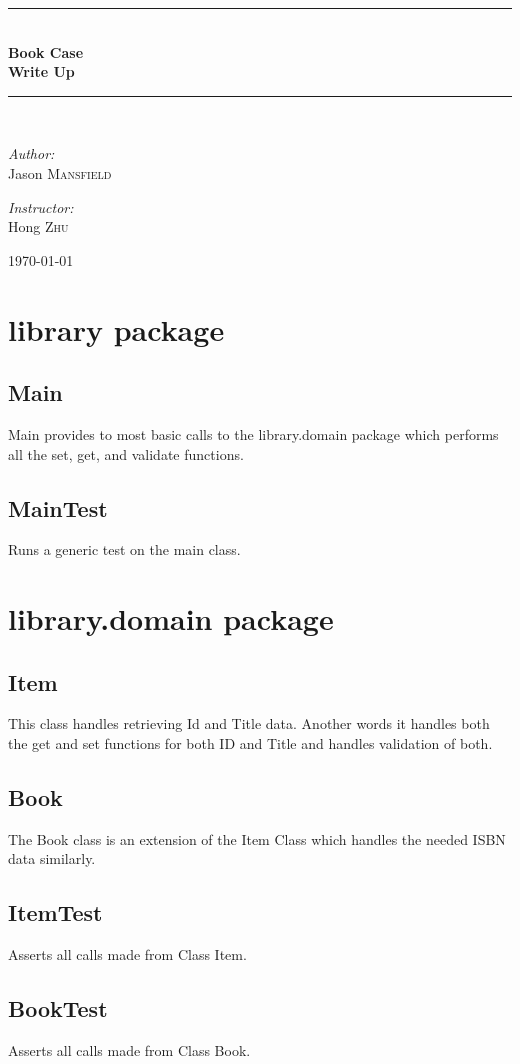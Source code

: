 \documentclass[11pt,a4paper]{article}
\newcommand{\HRule}{\rule{\linewidth}{0.5mm}}
\begin{document}
\begin{titlepage}
\begin{center}
\HRule \\[0.4cm]
{ \huge \bfseries Book Case}\\[0.4cm]
{ \huge \bfseries Write Up}\\[0.4cm]
\HRule \\[1.5cm]


\begin{minipage}{0.4\textwidth}
\begin{flushleft} \large
\emph{Author:}\\
Jason \textsc{Mansfield}
\end{flushleft}
\end{minipage}
\begin{minipage}{0.4\textwidth}
\begin{flushright} \large
\emph{Instructor:} \\
Hong \textsc{Zhu}
\end{flushright}
\end{minipage}
\vfill
{\large \today}
\end{center}
\end{titlepage}
\tableofcontents
\section{library package}
\subsection{Main}
Main provides to most basic calls to the library.domain package which performs all the set, get, and validate functions.
\subsection{MainTest}
Runs a generic test on the main class.
\section{library.domain package}
\subsection{Item}
This class handles retrieving Id and Title data. Another words it handles both the get and set functions for both ID and Title and handles validation of both.
\subsection{Book}
The Book class is an extension of the Item Class which handles the needed ISBN data similarly.
\subsection{ItemTest}
Asserts all calls made from Class Item.
\subsection{BookTest}
Asserts all calls made from Class Book.
\end{document}
